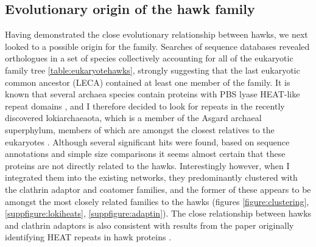 \documentclass[a4paper,11pt,twoside,openright]{scrbook}
\begin{document}
\subsection{Evolutionary origin of the hawk family}
Having demonstrated the close evolutionary relationship between hawks, we next looked to a possible origin for the family. Searches of sequence databases revealed orthologues in a set of species collectively accounting for all of the eukaryotic family tree \ref{table:eukaryotehawks}, strongly suggesting that the last eukaryotic common ancestor (LECA) contained at least one member of the family. It is known that several archaea species contain proteins with PBS lyase HEAT-like repeat domains \cite{Schlesner2009}, and I therefore decided to look for repeats in the recently discovered lokiarchaeaota, which is a member of the Asgard archaeal superphylum, members of which are amongst the closest relatives to the eukaryotes \cite{Spang2015,Zaremba-Niedzwiedzka2017}. Although several significant hits were found, based on sequence annotations and simple size comparisons it seems almost certain that these proteins are not directly related to the hawks. Interestingly however, when I integrated them into the existing networks, they predominantly clustered with the clathrin adaptor and coatomer families, and the former of these appears to be amongst the most closely related families to the hawks (figures \ref{figure:clustering}, \ref{suppfigure:lokiheats}, \ref{suppfigure:adaptin}). The close relationship between hawks and clathrin adaptors is also consistent with results from the paper originally identifying HEAT repeats in hawk proteins \cite{Neuwald2000}.
\end{document}
